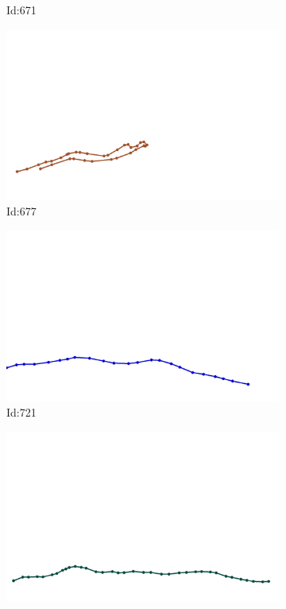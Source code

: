 \documentclass[12pt,twoside]{report}
\begin{document}
\begin{figure}
\begin{subfigure}[b]{0.20\textwidth}
\caption{Id:671}
\end{subfigure}
\begin{subfigure}[b]{0.20\textwidth}
\centering
\includegraphics[width=\textwidth]{../trajectories/677.png}
\caption{Id:677}
\end{subfigure}
\begin{subfigure}[b]{0.20\textwidth}
\centering
\includegraphics[width=\textwidth]{../trajectories/721.png}
\caption{Id:721}
\end{subfigure}
\begin{subfigure}[b]{0.20\textwidth}
\centering
\includegraphics[width=\textwidth]{../trajectories/727.png}

\end{subfigure}
\end{figure}
\end{document}
